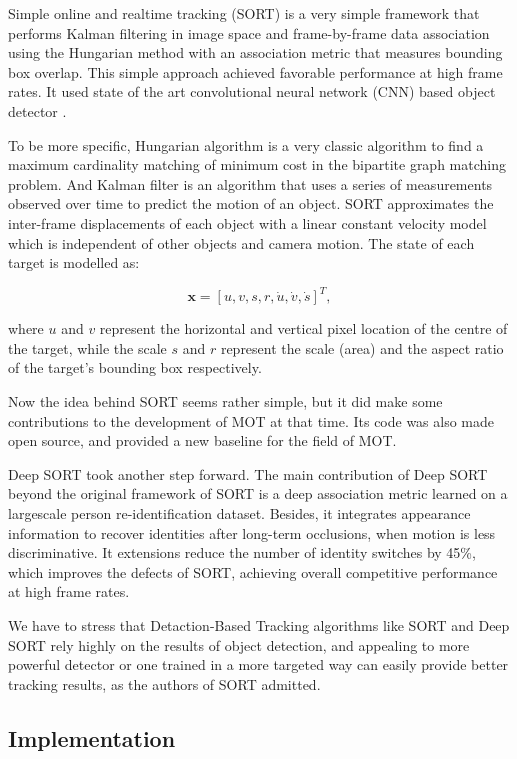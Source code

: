 \documentclass[conference]{IEEEtran}
\begin{document}
Simple online and realtime tracking (SORT) is a very simple framework that performs Kalman filtering in image space and frame-by-frame data association using the Hungarian method with an association metric that measures bounding box overlap. This simple approach achieved favorable performance at high frame rates. It used state of the art convolutional neural network (CNN) based object detector \cite{ren2015faster}.

To be more specific, Hungarian algorithm \cite{kuhn1955hungarian} is a very classic algorithm to find a maximum cardinality matching of minimum cost in the bipartite graph matching problem. And Kalman filter \cite{kalman1960new} is an algorithm that uses a series of measurements observed over time to predict the motion of an object. SORT approximates the inter-frame displacements of each object with a linear constant velocity model which is independent of other objects and camera motion. The state of each target is modelled as:

\[
    \boldsymbol{x} = [u,v,s,r,\dot{u},\dot{v},\dot{s}]^T, 
\]

\noindent where $u$ and $v$ represent the horizontal and vertical pixel location of the centre of the target, while the scale $s$ and $r$ represent the scale (area) and the aspect ratio of the target’s bounding box respectively.

Now the idea behind SORT seems rather simple, but it did make some contributions to the development of MOT at that time. Its code was also made open source, and provided a new baseline for the field of MOT.

Deep SORT took another step forward. The main contribution of Deep SORT beyond the original framework of SORT is a deep association metric learned on a largescale person re-identification dataset. Besides, it integrates appearance information to recover identities after long-term occlusions, when motion is less discriminative. It extensions reduce the number of identity switches by 45\%, which improves the defects of SORT, achieving overall competitive performance at high frame rates.

We have to stress that Detaction-Based Tracking algorithms like SORT and Deep SORT rely highly on the results of object detection, and appealing to more powerful detector or one trained in a more targeted way can easily provide better tracking results, as the authors of SORT admitted.

\subsection{Implementation}
\end{document}
